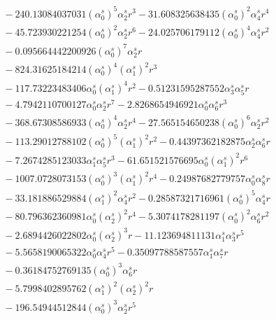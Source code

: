 \documentclass[10pt]{article}
\begin{document}
\begin{align*}
&{}  - 240.13084037031 \left(\alpha_{0}^s\right)^{5} \alpha_{2}^s r^{3} - 31.608325638435 \left(\alpha_{0}^s\right)^{2} \alpha_{4}^s r^{4} \\
&{}  - 45.723930221254 \left(\alpha_{0}^s\right)^{2} \alpha_{2}^s r^{6} - 24.025706179112 \left(\alpha_{0}^s\right)^{4} \alpha_{4}^s r^{2} \\
&{}  - 0.095664442200926 \left(\alpha_{0}^s\right)^{7} \alpha_{2}^s r \\
&{}  - 824.31625184214 \left(\alpha_{0}^s\right)^{4} \left(\alpha_{1}^s\right)^{2} r^{3} \\
&{}  - 117.73223483406 \alpha_{0}^s \left(\alpha_{1}^s\right)^{4} r^{2} - 0.51231595287552 \alpha_{3}^s \alpha_{5}^s r \\
&{}  - 4.7942110700127 \alpha_{0}^s \alpha_{2}^s r^{7} - 2.8268654946921 \alpha_{0}^s \alpha_{6}^s r^{3} \\
&{}  - 368.67308586933 \left(\alpha_{0}^s\right)^{4} \alpha_{2}^s r^{4} - 27.565154650238 \left(\alpha_{0}^s\right)^{6} \alpha_{2}^s r^{2} \\
&{}  - 113.29012788102 \left(\alpha_{0}^s\right)^{5} \left(\alpha_{1}^s\right)^{2} r^{2} - 0.44397362182875 \alpha_{2}^s \alpha_{6}^s r \\
&{}  - 7.2674285123033 \alpha_{1}^s \alpha_{5}^s r^{3} - 61.651521576695 \alpha_{0}^s \left(\alpha_{1}^s\right)^{2} r^{6} \\
&{}  - 1007.0728073153 \left(\alpha_{0}^s\right)^{3} \left(\alpha_{1}^s\right)^{2} r^{4} - 0.24987682779757 \alpha_{0}^s \alpha_{8}^s r \\
&{}  - 33.181886529884 \left(\alpha_{1}^s\right)^{2} \alpha_{4}^s r^{2} - 0.28587321716961 \left(\alpha_{0}^s\right)^{5} \alpha_{4}^s r \\
&{}  - 80.796362360981 \alpha_{0}^s \left(\alpha_{2}^s\right)^{2} r^{4} - 5.3074178281197 \left(\alpha_{0}^s\right)^{2} \alpha_{6}^s r^{2} \\
&{}  - 2.6894426022802 \alpha_{0}^s \left(\alpha_{2}^s\right)^{3} r - 11.123694811131 \alpha_{1}^s \alpha_{3}^s r^{5} \\
&{}  - 5.5658190065322 \alpha_{0}^s \alpha_{4}^s r^{5} - 0.35097788587557 \alpha_{1}^s \alpha_{7}^s r \\
&{}  - 0.36184752769135 \left(\alpha_{0}^s\right)^{3} \alpha_{6}^s r \\
&{}  - 5.7998402895762 \left(\alpha_{1}^s\right)^{2} \left(\alpha_{2}^s\right)^{2} r \\
&{}  - 196.54944512844 \left(\alpha_{0}^s\right)^{3} \alpha_{2}^s r^{5} \\

\end{align*}
\end{document}
